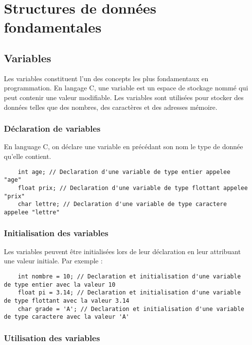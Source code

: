 \chapter{Structures de donn\'ees fondamentales}
\section{Variables}
Les variables constituent l'un des concepts les plus fondamentaux en programmation. En langage C, une variable est un espace de stockage nommé qui peut contenir une valeur modifiable. Les variables sont utilisées pour stocker des données telles que des nombres, des caractères et des adresses mémoire.

\subsection{Déclaration de variables}

En language C, on d\'eclare une variable en pr\'ec\'edant son nom le type de donn\'ee qu'elle contient. 

\begin{lstlisting}
	int age; // Declaration d'une variable de type entier appelee "age"
	float prix; // Declaration d'une variable de type flottant appelee "prix"
	char lettre; // Declaration d'une variable de type caractere appelee "lettre"
\end{lstlisting}

\subsection{Initialisation des variables}

Les variables peuvent être initialisées lors de leur déclaration en leur attribuant une valeur initiale. Par exemple :

\begin{lstlisting}
	int nombre = 10; // Declaration et initialisation d'une variable de type entier avec la valeur 10
	float pi = 3.14; // Declaration et initialisation d'une variable de type flottant avec la valeur 3.14
	char grade = 'A'; // Declaration et initialisation d'une variable de type caractere avec la valeur 'A'
\end{lstlisting}

\subsection{Utilisation des variables}

